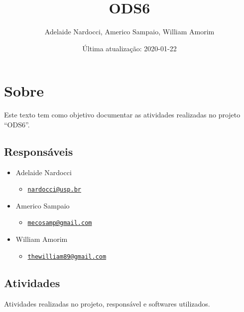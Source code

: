 \documentclass[]{book}
\title{ODS6}
\author{Adelaide Nardocci, Americo Sampaio, William Amorim}
\date{Última atualização: 2020-01-22}
\providecommand{\tightlist}{%
  \setlength{\itemsep}{0pt}\setlength{\parskip}{0pt}}
\begin{document}
\maketitle

{
\setcounter{tocdepth}{1}
\tableofcontents
}
\hypertarget{sobre}{%
\chapter*{Sobre}\label{sobre}}

Este texto tem como objetivo documentar as atividades realizadas no projeto ``ODS6''.

\hypertarget{responsuxe1veis}{%
\section*{Responsáveis}\label{responsuxe1veis}}

\begin{itemize}
\tightlist
\item
  Adelaide Nardocci

  \begin{itemize}
  \tightlist
  \item
    \href{mailto:nardocci@usp.br}{\nolinkurl{nardocci@usp.br}}
  \end{itemize}
\item
  Americo Sampaio

  \begin{itemize}
  \tightlist
  \item
    \href{mailto:mecosamp@gmail.com}{\nolinkurl{mecosamp@gmail.com}}
  \end{itemize}
\item
  William Amorim

  \begin{itemize}
  \tightlist
  \item
    \href{mailto:thewilliam89@gmail.com}{\nolinkurl{thewilliam89@gmail.com}}
  \end{itemize}
\end{itemize}

\hypertarget{atividades}{%
\section*{Atividades}\label{atividades}}

Atividades realizadas no projeto, responsável e softwares utilizados.
\end{document}
